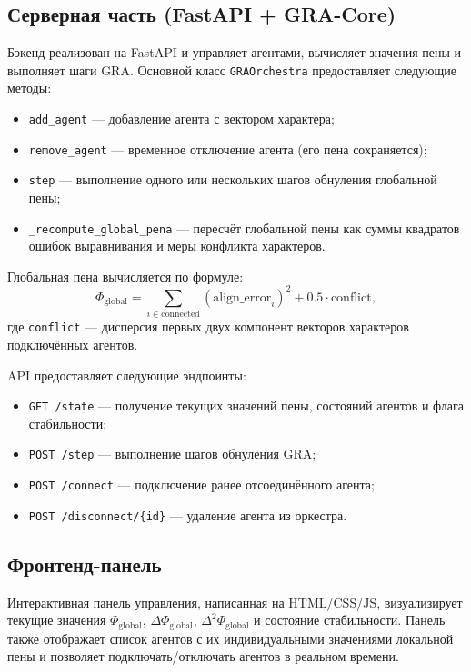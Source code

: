 \documentclass[twocolumn]{article}
\begin{document}
\subsection{Серверная часть (FastAPI + GRA-Core)}
Бэкенд реализован на FastAPI и управляет агентами, вычисляет значения пены и выполняет шаги GRA. Основной класс \texttt{GRAOrchestra} предоставляет следующие методы:
\begin{itemize}
\item \texttt{add\_agent} — добавление агента с вектором характера;
\item \texttt{remove\_agent} — временное отключение агента (его пена сохраняется);
\item \texttt{step} — выполнение одного или нескольких шагов обнуления глобальной пены;
\item \texttt{\_recompute\_global\_pena} — пересчёт глобальной пены как суммы квадратов ошибок выравнивания и меры конфликта характеров.
\end{itemize}

Глобальная пена вычисляется по формуле:
\begin{equation}
\Phi_{\text{global}} = \sum_{i \in \text{connected}} (\text{align\_error}_i)^2 + 0.5 \cdot \text{conflict},
\end{equation}
где \texttt{conflict} — дисперсия первых двух компонент векторов характеров подключённых агентов.

API предоставляет следующие эндпоинты:
\begin{itemize}
\item \texttt{GET /state} — получение текущих значений пены, состояний агентов и флага стабильности;
\item \texttt{POST /step} — выполнение шагов обнуления GRA;
\item \texttt{POST /connect} — подключение ранее отсоединённого агента;
\item \texttt{POST /disconnect/\{id\}} — удаление агента из оркестра.
\end{itemize}

\subsection{Фронтенд-панель}
Интерактивная панель управления, написанная на HTML/CSS/JS, визуализирует текущие значения $\Phi_{\text{global}}$, $\Delta\Phi_{\text{global}}$, $\Delta^2\Phi_{\text{global}}$ и состояние стабильности. Панель также отображает список агентов с их индивидуальными значениями локальной пены и позволяет подключать/отключать агентов в реальном времени.
\end{document}
